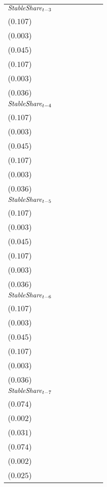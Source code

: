\begin{tabular}{lllllll}
${\it StableShare}_{t-3}$  &  \makecell{$-0.387^{***}$ \\ ($0.107$)} &   \makecell{$0.010^{***}$ \\ ($0.003$)} &   \makecell{$0.129^{***}$ \\ ($0.045$)} &  \makecell{$-0.385^{***}$ \\ ($0.107$)} &   \makecell{$0.010^{***}$ \\ ($0.003$)} &      \makecell{$0.059^{}$ \\ ($0.036$)} \\
${\it StableShare}_{t-4}$  &   \makecell{$0.585^{***}$ \\ ($0.107$)} &  \makecell{$-0.025^{***}$ \\ ($0.003$)} &   \makecell{$0.190^{***}$ \\ ($0.045$)} &   \makecell{$0.585^{***}$ \\ ($0.107$)} &  \makecell{$-0.025^{***}$ \\ ($0.003$)} &     \makecell{$-0.005^{}$ \\ ($0.036$)} \\
${\it StableShare}_{t-5}$  &     \makecell{$-0.027^{}$ \\ ($0.107$)} &  \makecell{$-0.012^{***}$ \\ ($0.003$)} &  \makecell{$-0.244^{***}$ \\ ($0.045$)} &     \makecell{$-0.022^{}$ \\ ($0.107$)} &  \makecell{$-0.012^{***}$ \\ ($0.003$)} &     \makecell{$-0.018^{}$ \\ ($0.036$)} \\
${\it StableShare}_{t-6}$  &     \makecell{$-0.002^{}$ \\ ($0.107$)} &  \makecell{$-0.018^{***}$ \\ ($0.003$)} &   \makecell{$0.295^{***}$ \\ ($0.045$)} &     \makecell{$-0.021^{}$ \\ ($0.107$)} &  \makecell{$-0.017^{***}$ \\ ($0.003$)} &   \makecell{$0.201^{***}$ \\ ($0.036$)} \\
${\it StableShare}_{t-7}$  &  \makecell{$-0.222^{***}$ \\ ($0.074$)} &  \makecell{$-0.011^{***}$ \\ ($0.002$)} &  \makecell{$-0.125^{***}$ \\ ($0.031$)} &  \makecell{$-0.210^{***}$ \\ ($0.074$)} &  \makecell{$-0.011^{***}$ \\ ($0.002$)} &  \makecell{$-0.129^{***}$ \\ ($0.025$)} \\

\end{tabular}
